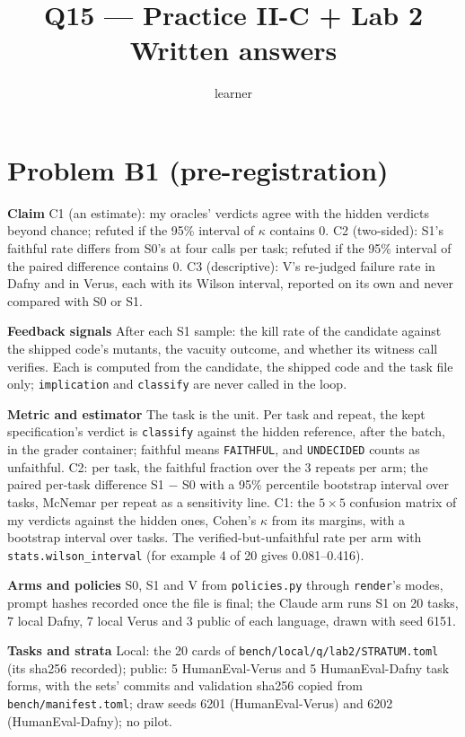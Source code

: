 \documentclass[11pt]{article}
\title{Q15 --- Practice II-C + Lab 2 \\ \large Written answers}
\author{learner}
\date{}
\begin{document}
\maketitle
\sloppy

\section*{Problem B1 (pre-registration)}\label{ans:B1}
\begin{answer}
\textbf{Claim} C1 (an estimate): my oracles' verdicts agree with the hidden
verdicts beyond chance; refuted if the 95\% interval of $\kappa$ contains 0.
C2 (two-sided): S1's faithful rate differs from S0's at four calls per task;
refuted if the 95\% interval of the paired difference contains 0. C3
(descriptive): V's re-judged failure rate in Dafny and in Verus, each with its
Wilson interval, reported on its own and never compared with S0 or S1.

\textbf{Feedback signals} After each S1 sample: the kill rate of the candidate
against the shipped code's mutants, the vacuity outcome, and whether its
witness call verifies. Each is computed from the candidate, the shipped code
and the task file only; \texttt{implication} and \texttt{classify} are never
called in the loop.

\textbf{Metric and estimator} The task is the unit. Per task and repeat, the
kept specification's verdict is \texttt{classify} against the hidden reference,
after the batch, in the grader container; faithful means \texttt{FAITHFUL},
and \texttt{UNDECIDED} counts as unfaithful. C2: per task, the faithful fraction
over the 3 repeats per arm; the paired per-task difference S1 $-$ S0 with a
95\% percentile bootstrap interval over tasks, McNemar per repeat as a
sensitivity line. C1: the $5 \times 5$ confusion matrix of my verdicts against
the hidden ones, Cohen's $\kappa$ from its margins, with a bootstrap interval
over tasks. The verified-but-unfaithful rate per arm with
\texttt{stats.wilson\_interval} (for example 4 of 20 gives 0.081--0.416).

\textbf{Arms and policies} S0, S1 and V from \texttt{policies.py} through
\texttt{render}'s modes, prompt hashes recorded once the file is final; the
Claude arm runs S1 on 20 tasks, 7 local Dafny, 7 local Verus and 3 public of
each language, drawn with seed 6151.

\textbf{Tasks and strata} Local: the 20 cards of
\texttt{bench/local/q/lab2/STRATUM.toml} (its sha256 recorded); public: 5
HumanEval-Verus and 5 HumanEval-Dafny task forms, with the sets' commits and
validation sha256 copied from \texttt{bench/manifest.toml}; draw seeds 6201
(HumanEval-Verus) and 6202 (HumanEval-Dafny); no pilot.


\end{answer}
\end{document}
